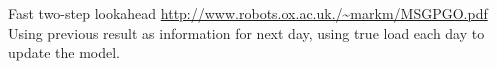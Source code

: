 \documentclass[a4paper, 10 pt, conference]{ieeeconf}  %
\begin{document}
Fast two-step lookahead \url{http://www.robots.ox.ac.uk./~markm/MSGPGO.pdf}
Using previous result as information for next day, using true load each day to update the model.

\section*{}
\pagebreak
\singlespacing
\twocolumn



\end{document}
